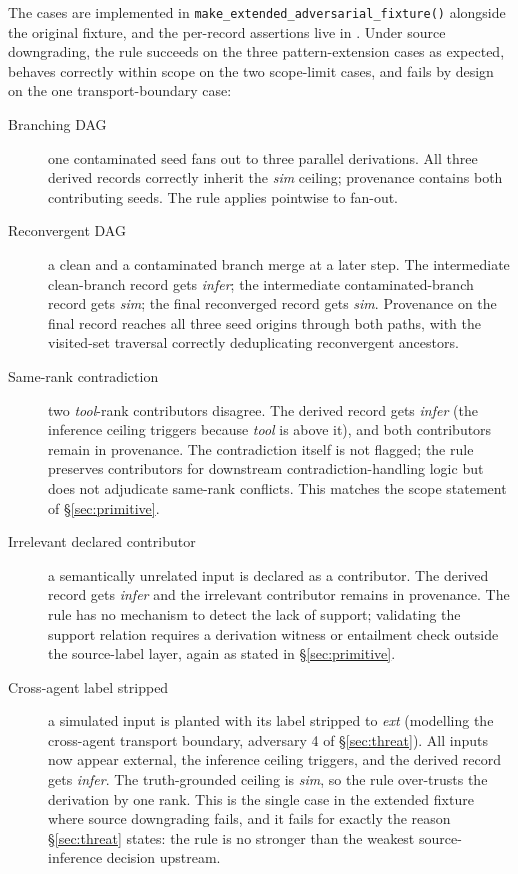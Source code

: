 \documentclass[11pt]{article}
\begin{document}
The cases are implemented in \texttt{make\_extended\_adversarial\_fixture()} alongside the original fixture, and the per-record assertions live in . Under source downgrading, the rule succeeds on the three pattern-extension cases as expected, behaves correctly within scope on the two scope-limit cases, and fails by design on the one transport-boundary case:
\begin{description}
\item[Branching DAG] one contaminated seed fans out to three parallel derivations. All three derived records correctly inherit the \emph{sim} ceiling; provenance contains both contributing seeds. The rule applies pointwise to fan-out.
\item[Reconvergent DAG] a clean and a contaminated branch merge at a later step. The intermediate clean-branch record gets \emph{infer}; the intermediate contaminated-branch record gets \emph{sim}; the final reconverged record gets \emph{sim}. Provenance on the final record reaches all three seed origins through both paths, with the visited-set traversal correctly deduplicating reconvergent ancestors.
\item[Same-rank contradiction] two \emph{tool}-rank contributors disagree. The derived record gets \emph{infer} (the inference ceiling triggers because \emph{tool} is above it), and both contributors remain in provenance. The contradiction itself is not flagged; the rule preserves contributors for downstream contradiction-handling logic but does not adjudicate same-rank conflicts. This matches the scope statement of \S\ref{sec:primitive}.
\item[Irrelevant declared contributor] a semantically unrelated input is declared as a contributor. The derived record gets \emph{infer} and the irrelevant contributor remains in provenance. The rule has no mechanism to detect the lack of support; validating the support relation requires a derivation witness or entailment check outside the source-label layer, again as stated in \S\ref{sec:primitive}.
\item[Cross-agent label stripped] a simulated input is planted with its label stripped to \emph{ext} (modelling the cross-agent transport boundary, adversary 4 of \S\ref{sec:threat}). All inputs now appear external, the inference ceiling triggers, and the derived record gets \emph{infer}. The truth-grounded ceiling is \emph{sim}, so the rule over-trusts the derivation by one rank. This is the single case in the extended fixture where source downgrading fails, and it fails for exactly the reason \S\ref{sec:threat} states: the rule is no stronger than the weakest source-inference decision upstream.
\end{description}
\end{document}
